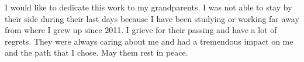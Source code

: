 I would like to dedicate this work to my grandparents. I was not able to stay by their side during their last days because I have been studying or working far away from where I grew up since 2011. I grieve for their passing and have a lot of regrets. They were always caring about me and had a tremendous impact on me and the path that I chose. May them rest in peace.